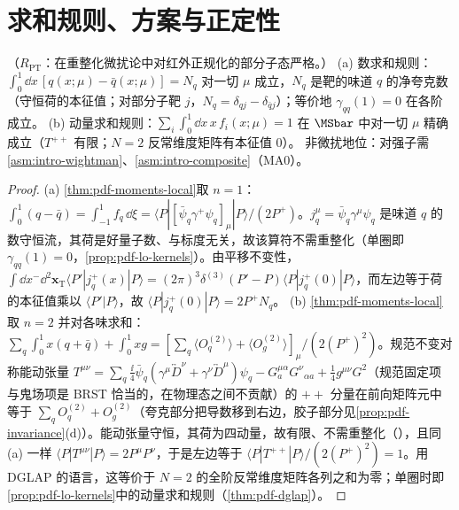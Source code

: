 \section{求和规则、方案与正定性}\label{sec:pdf-sumrules}

\begin{proposition}\label{prop:pdf-sum-rules}
（$R_{\mathrm{PT}}$：在重整化微扰论中对红外正规化的部分子态严格。）
(a) 数求和规则：$\int_0^1\dd x\,[q(x;\mu)-\bar q(x;\mu)]=N_q$ 对一切 $\mu$ 成立，$N_q$ 是靶的味道 $q$ 的净夸克数（守恒荷的本征值；对部分子靶 $j$，$N_q=\delta_{qj}-\delta_{\bar qj}$）；等价地 $\gamma_{qq}(1)=0$ 在各阶成立。
(b) 动量求和规则：$\sum_i\int_0^1\dd x\,x\,f_i(x;\mu)=1$ 在 $\MSbar$ 中对一切 $\mu$ 精确成立（$T^{++}$ 有限；$N=2$ 反常维度矩阵有本征值 $0$）。
非微扰地位：对强子需\cref{asm:intro-wightman}、\cref{asm:intro-composite}（MA0）。
\end{proposition}

\begin{proof}
(a) \cref{thm:pdf-moments-local}取 $n=1$：$\int_0^1(q-\bar q)=\int_{-1}^1f_q\,\dd\xi=\langle P|[\bar\psi_q\gamma^+\psi_q]_\mu|P\rangle/(2P^+)$。$j^\mu_q=\bar\psi_q\gamma^\mu\psi_q$ 是味道 $q$ 的数守恒流，其荷是好量子数、与标度无关，故该算符不需重整化（单圈即 $\gamma_{qq}(1)=0$，\cref{prop:pdf-lo-kernels}）。由平移不变性，$\int\dd x^-\dd^2\bm x_{\mathrm T}\langle P'|j^+_q(x)|P\rangle=(2\pi)^3\delta^{(3)}(P'-P)\langle P|j^+_q(0)|P\rangle$，而左边等于荷的本征值乘以 $\langle P'|P\rangle$，故 $\langle P|j^+_q(0)|P\rangle=2P^+N_q$。
(b) \cref{thm:pdf-moments-local}取 $n=2$ 并对各味求和：$\sum_q\int_0^1x(q+\bar q)+\int_0^1xg=[\sum_q\langle O^{(2)}_q\rangle+\langle O^{(2)}_g\rangle]_\mu/(2(P^+)^2)$。规范不变对称能动张量 $T^{\mu\nu}=\sum_q\frac{\ii}4\bar\psi_q(\gamma^\mu\overleftrightarrow D^\nu+\gamma^\nu\overleftrightarrow D^\mu)\psi_q-G^{\mu\alpha}_aG^\nu{}_{\alpha a}+\frac14g^{\mu\nu}G^2$（规范固定项与鬼场项是 BRST 恰当的，在物理态之间不贡献）的 $++$ 分量在前向矩阵元中等于 $\sum_qO^{(2)}_q+O^{(2)}_g$（夸克部分把导数移到右边，胶子部分见\cref{prop:pdf-invariance}(d)）。能动张量守恒，其荷为四动量，故有限、不需重整化（\cite{Collins1984}），且同 (a) 一样 $\langle P|T^{\mu\nu}|P\rangle=2P^\mu P^\nu$，于是左边等于 $\langle P|T^{++}|P\rangle/(2(P^+)^2)=1$。用 DGLAP 的语言，这等价于 $N=2$ 的全阶反常维度矩阵各列之和为零；单圈时即\cref{prop:pdf-lo-kernels}中的动量求和规则（\cref{thm:pdf-dglap}）。
\end{proof}

